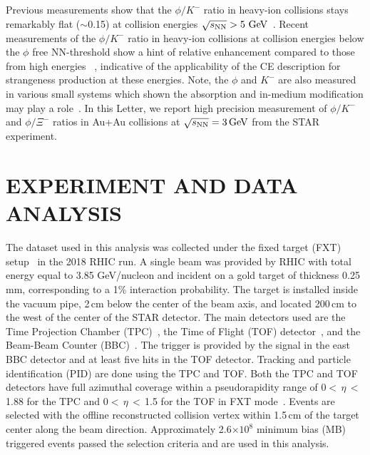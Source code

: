 \documentclass[aps,tightenlines,superscriptaddress,twocolumn]{revtex4-1}
\begin{document}
Previous measurements 
show that the $\phi/K^-$ ratio in heavy-ion collisions stays remarkably flat ($\sim$0.15) at collision energies ${\sqrt{s_{\rm NN}} > \textup{5 GeV}}$~\cite{E917_phi:2004,NA49_phi:2008,star_bes_strangeness:2020}. Recent measurements of the $\phi/K^-$ ratio in heavy-ion collisions at collision energies below the $\phi$ free NN-threshold %
show a hint of relative enhancement compared to those from high energies
~\cite{HADES_phi_ArKCl:2009,FOPI_phi_NiNi:2015,FOPI_phi_AlAl:2016,HADES_phi_AuAu:2018}, indicative of the applicability of the CE description for strangeness production at these energies. Note, the $\phi$ and $K^-$ are also measured in various small systems which shown the absorption and in-medium modification may play a role~\cite{HADES_PRL_pA:2007,HADES_PRL_W_C:2019,ALICE_PRL_pp:2021}. In this Letter, we report high precision measurement of $\phi/K^-$ and $\phi/\Xi^-$ ratios in Au+Au collisions at ${\sqrt{s_{\rm NN}} = \rm{3\,GeV}}$ from the STAR experiment.

\section{EXPERIMENT AND DATA ANALYSIS }
\label{dataanalysis}

The dataset used in this analysis
was collected under the fixed target (FXT) setup~\cite{Meehan_2016} in the 2018 RHIC run. 
A single beam was provided by RHIC with total energy equal to 3.85 GeV/nucleon and incident on a gold target of thickness 0.25 mm, corresponding to a 1\% interaction probability.
The target is installed inside the vacuum pipe, 2\,cm below the center of the beam axis, and located 200\,cm to the west of the center of the STAR detector. The main detectors used are the Time Projection Chamber (TPC)~\cite{TPC:2003}, the Time of Flight (TOF) detector~\cite{TOF:2012}, and the Beam-Beam Counter (BBC)~\cite{BBC_Whitten:2008}. The trigger is provided by the signal in the east BBC detector and at least five hits in the TOF detector. Tracking and particle identification (PID) are done using the TPC and TOF. Both the TPC and TOF detectors have full azimuthal coverage within a pseudorapidity range of 0$<$\,$\eta$\,$<$\,1.88 for the TPC and 0$<$\,$\eta$\,$<$\,1.5 for the TOF in FXT mode~\cite{TPC:2003,TOF:2012}. Events are selected with the offline reconstructed collision vertex within 1.5\,cm of the target center along the beam direction. Approximately 2.6$\times 10^{8}$ minimum bias (MB) triggered events passed the selection criteria and are used in this analysis. 
\end{document}
